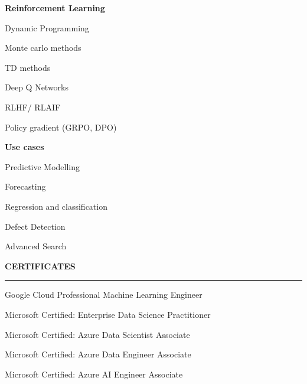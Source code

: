 \documentclass[10pt, a4paper]{article}
\newcommand{\sidebarsection}[1]{%
  \vspace{1.2\baselineskip}%
  {\color{white}\bfseries\sffamily\MakeUppercase{#1}}\par%
  \vspace{0.6ex}%
  {\color{white!60}\hrule height 0.6pt}\par%
  \vspace{0.5\baselineskip}%
}
\newcommand{\skillcat}[1]{%
    \vspace{0.8\baselineskip}%
    {\bfseries\sffamily #1}\par\vspace{1.0ex}%
}
\begin{document}
\begin{paracol}{2}
\skillcat{Reinforcement Learning}
Dynamic Programming\par\vspace{0.4ex}
Monte carlo methods\par\vspace{0.4ex}
TD methods\par\vspace{0.4ex}
Deep Q Networks\par\vspace{0.4ex}
RLHF/ RLAIF\par\vspace{0.4ex}
Policy gradient (GRPO, DPO)\par

\skillcat{Use cases}
Predictive Modelling\par\vspace{0.4ex}
Forecasting\par\vspace{0.4ex}
Regression and classification\par\vspace{0.4ex}
Defect Detection\par\vspace{0.4ex}
Advanced Search\par\vspace{0.4ex}

\sidebarsection{Certificates}
Google Cloud Professional Machine Learning Engineer\par\vspace{0.4ex}
Microsoft Certified: Enterprise Data Science Practitioner\par\vspace{0.4ex}
Microsoft Certified: Azure Data Scientist Associate\par\vspace{0.4ex}
Microsoft Certified: Azure Data Engineer Associate\par\vspace{0.4ex}
Microsoft Certified: Azure AI Engineer Associate\par\vspace{0.4ex}


\end{paracol}
\end{document}
